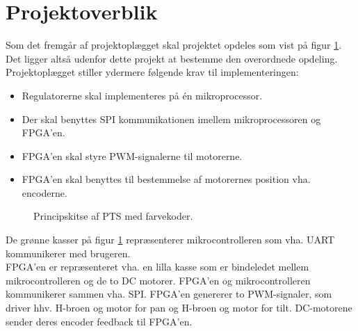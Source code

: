 \section{Projektoverblik}
\label{sec:projektoverblik}
Som det fremgår af projektoplægget skal projektet opdeles som vist på 
figur \ref{fig:overview_openloop_PTS}. 
Det ligger altså udenfor dette projekt at bestemme den overordnede opdeling.
Projektoplægget stiller ydermere følgende krav til implementeringen:
\begin{itemize}
\itemsep1pt
  \item Regulatorerne skal implementeres på én mikroprocessor.
  \item Der skal benyttes SPI kommunikationen imellem mikroprocessoren og FPGA’en.
  \item FPGA’en skal styre PWM-signalerne til motorerne.
  \item FPGA’en skal benyttes til bestemmelse af motorernes position vha. encoderne.
\end{itemize}

\bigskip

\begin{figure}[!th]
\centering
\begin{tikzpicture}[auto, node distance=1cm,>=latex']

\end{tikzpicture}
\caption[Principskitse af PTS]{Principskitse af PTS med farvekoder.}
\label{fig:overview_openloop_PTS}
\end{figure}
De grønne kasser på figur \ref{fig:overview_openloop_PTS}
repræsenterer mikrocontrolleren som vha. UART kommunikerer med brugeren. \\
FPGA'en er repræsenteret vha. en lilla kasse som er bindeledet mellem mikrocontrolleren og de to DC motorer. 
FPGA'en og mikrocontrolleren kommunikerer sammen vha. SPI.
FPGA'en genererer to PWM-signaler, som driver hhv. H-broen og motor for
pan og H-broen og motor for tilt. DC-motorene sender deres encoder feedback til FPGA'en.